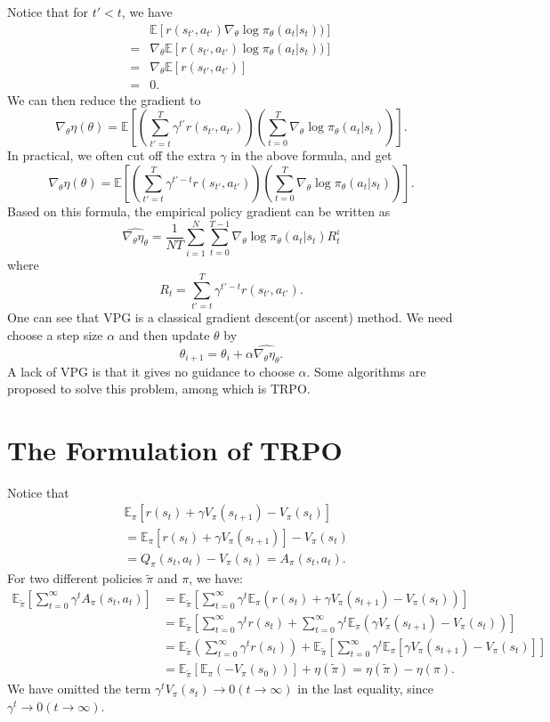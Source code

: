 Notice that for $t'<t$, we have
\begin{align*}
	&\mathbb{E}[r(s_{t'},a_{t'})\nabla_{\theta}\log\pi_{\theta}(a_t|s_t))]\\
	=&\nabla_{\theta}\mathbb{E}[r(s_{t'},a_{t'})\log\pi_{\theta}(a_t|s_t))]\\
	=&\nabla_{\theta}\mathbb{E}[r(s_{t'},a_{t'})]\\
	=&0.
\end{align*}
We can then reduce the gradient to
\[\nabla_{\theta}\eta(\theta)=\mathbb{E}\left[ \left(\sum_{t'=t}^T \gamma^{t'}r(s_{t'},a_{t'})\right)\left(\sum_{t=0}^T \nabla_{\theta}\log\pi_{\theta}(a_t|s_t)\right)  \right].\]
In practical, we often cut off the extra $\gamma$ in the above formula, and get
\[\nabla_{\theta}\eta(\theta)=\mathbb{E}\left[ \left(\sum_{t'=t}^T \gamma^{t'-t}r(s_{t'},a_{t'})\right)\left(\sum_{t=0}^T \nabla_{\theta}\log\pi_{\theta}(a_t|s_t)\right)  \right].\]
Based on this formula, the empirical policy gradient can be written as
\[\widehat{\nabla_{\theta}\eta_{\theta}}=\frac{1}{NT}\sum_{i=1}^N\sum_{t=0}^{T-1}\nabla_{\theta}\log\pi_{\theta}(a_t|s_t)R_t^i\]
where
\[R_t=\sum_{t'=t}^T\gamma^{t'-t}r(s_{t'},a_{t'}).\]
One can see that VPG is a classical gradient descent(or ascent) method. We need choose a step size $\alpha$ and then update $\theta$ by
\[\theta_{i+1}=\theta_{i}+\alpha\widehat{\nabla_{\theta}\eta_{\theta}}.\]
A lack of VPG is that it gives no guidance to choose $\alpha$. Some algorithms are proposed to solve this problem, among which is TRPO.

\section{The Formulation of TRPO}
Notice that
\begin{align*}
&\mathbb{E}_{\pi}[r(s_{t})+\gamma V_{\pi}(s_{t+1})-V_{\pi}(s_{t})]\\
&=\mathbb{E}_{\pi}[r(s_{t})+\gamma V_{\pi}(s_{t+1})]-V_{\pi}(s_{t})\\
 &=Q_{\pi}(s_{t},a_{t})-V_{\pi}(s_{t})=A_{\pi}(s_{t},a_{t}).
\end{align*}
For two different policies $\tilde{\pi}$ and $\pi$, we have:
\begin{align*}
\mathbb{E}_{\tilde{\pi}}[\sum_{t=0}^{\infty}\gamma^{t}A_{\pi}(s_{t},a_{t})]&=\mathbb{E}_{\tilde{\pi}}[\sum_{t=0}^{\infty}\gamma^{t}\mathbb{E}_{\pi}(r(s_{t})+\gamma V_{\pi}(s_{t+1})-V_{\pi}(s_{t}))]\\
&=\mathbb{E}_{\tilde{\pi}}[\sum_{t=0}^{\infty}\gamma^{t}r(s_{t})+\sum_{t=0}^{\infty}\gamma^{t}\mathbb{E}_{\pi}(\gamma V_{\pi}(s_{t+1})-V_{\pi}(s_{t}))]\\
&=\mathbb{E}_{\tilde{\pi}}(\sum_{t=0}^{\infty}\gamma^{t}r(s_{t}))+\mathbb{E}_{\tilde{\pi}}[\sum_{t=0}^{\infty}\gamma^{t}\mathbb{E}_{\pi}[\gamma V_{\pi}(s_{t+1})-V_{\pi}(s_{t})]]\\
&=\mathbb{E}_{\tilde{\pi}}[\mathbb{E}_{\pi}(-V_{\pi}(s_{0}))]+\eta(\tilde{\pi})=\eta(\tilde{\pi})-\eta(\pi).
\end{align*}
We have omitted the term $\gamma^{t}V_{\pi}(s_{t})\rightarrow0(t\rightarrow\infty)$ in the last equality, since $\gamma^{t}\rightarrow 0(t\rightarrow\infty)$.

